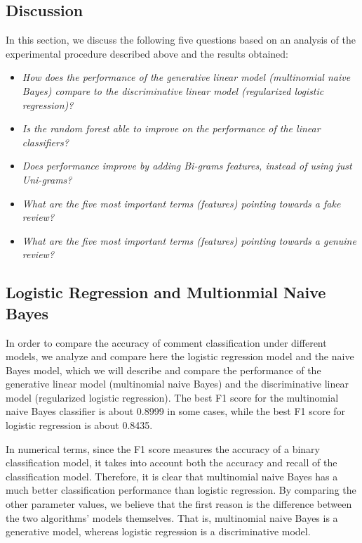 \documentclass[a4paper, 11pt]{article}
\begin{document}
\begin{multicols}{2}

\section{Discussion}
In this section, we discuss the following five questions based on an analysis of the experimental procedure described above and the results obtained:
\begin{itemize}
    \item \emph{How does the performance of the generative linear model (multinomial naive Bayes) compare to the discriminative linear model (regularized logistic regression)? }
    \item \emph{Is the random forest able to improve on the performance of the linear classifiers? }
    \item \emph{Does performance improve by adding Bi-grams features, instead of using just Uni-grams?  }
    \item \emph{What are the five most important terms (features) pointing towards a fake review? }
    \item \emph{What are the five most important terms (features) pointing towards a genuine review?  }
\end{itemize}


\subsection{Logistic Regression and Multionmial Naive Bayes}
In order to compare the accuracy of comment classification under different models, we analyze and compare here the logistic regression model and the naive Bayes model, which we will describe and compare the performance of the generative linear model (multinomial naive Bayes) and the discriminative linear model (regularized logistic regression). The best F1 score for the multinomial naive Bayes classifier is about 0.8999 in some cases, while the best F1 score for logistic regression is about 0.8435.

In numerical terms, since the F1 score measures the accuracy of a binary classification model, it takes into account both the accuracy and recall of the classification model. Therefore, it is clear that multinomial naive Bayes has a much better classification performance than logistic regression. By comparing the other parameter values, we believe that the first reason is the difference between the two algorithms' models themselves. That is, multinomial naive Bayes is a generative model, whereas logistic regression is a discriminative model. 


\end{multicols}
\end{document}
